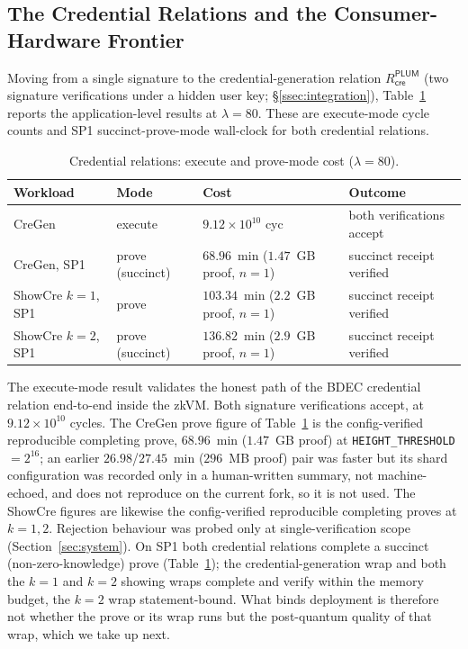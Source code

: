\subsection{The Credential Relations and the Consumer-Hardware Frontier}\label{ssec:frontier}
Moving from a single signature to the credential-generation relation $R_{\mathsf{cre}}^{\mathsf{PLUM}}$ (two signature verifications under a hidden user key; \S\ref{ssec:integration}), Table~\ref{tab:bdec} reports the application-level results at $\lambda=80$. These are execute-mode cycle counts and SP1 succinct-prove-mode wall-clock for both credential relations.

\begin{table}[H]
\centering
\small
\begin{tabular}{l l p{3.2cm} p{4.6cm}}
\toprule
Workload & Mode & Cost & Outcome \\
\midrule
CreGen & execute & $9.12\times10^{10}$ cyc & both verifications accept \\ %
CreGen, SP1 & prove (succinct) & $68.96$~min ($1.47$~GB proof, $n{=}1$) & succinct receipt verified \\ %
ShowCre $k{=}1$, SP1 & prove & $103.34$~min ($2.2$~GB proof, $n{=}1$) & succinct receipt verified \\
ShowCre $k{=}2$, SP1 & prove (succinct) & $136.82$~min ($2.9$~GB proof, $n{=}1$) & succinct receipt verified \\
\bottomrule
\end{tabular}
\caption{Credential relations: execute and prove-mode cost ($\lambda=80$).}
\label{tab:bdec}
\end{table}

The execute-mode result validates the honest path of the BDEC credential relation end-to-end inside the zkVM. Both signature verifications accept, at $9.12\times10^{10}$ cycles. The CreGen prove figure of Table~\ref{tab:bdec} is the config-verified reproducible completing prove, $68.96$~min ($1.47$~GB proof) at \texttt{HEIGHT\_THRESHOLD}$=2^{16}$; an earlier $26.98$/$27.45$~min ($296$~MB proof) pair was faster but its shard configuration was recorded only in a human-written summary, not machine-echoed, and does not reproduce on the current fork, so it is not used. The ShowCre figures are likewise the config-verified reproducible completing proves at $k{=}1,2$. Rejection behaviour was probed only at single-verification scope (Section~\ref{sec:system}). On SP1 both credential relations complete a succinct (non-zero-knowledge) prove (Table~\ref{tab:bdec}); the credential-generation wrap and both the $k{=}1$ and $k{=}2$ showing wraps complete and verify within the memory budget, the $k{=}2$ wrap statement-bound. What binds deployment is therefore not whether the prove or its wrap runs but the post-quantum quality of that wrap, which we take up next.

